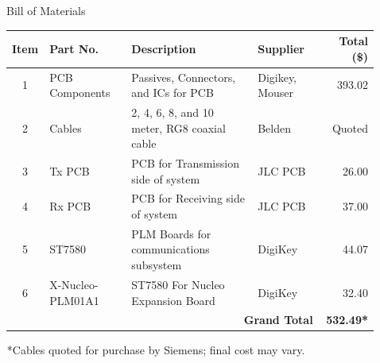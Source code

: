 \documentclass[final]{beamer}
\newlength{\sepwidth}
\newlength{\colwidth}
\newcommand{\separatorcolumn}{\begin{column}{\sepwidth}\end{column}}
\newcommand{\sectionHeading}[1]{\vskip2.0ex \textbf{#1} \vskip0.25ex}
\begin{document}
\begin{frame}[t]
\begin{columns}[t]
\begin{column}{\colwidth}
  \begin{block}{Bill of Materials}
    \centering
    \renewcommand{\arraystretch}{1.2}
    \begin{tabularx}{\linewidth}{
        c                          %
        l                          %
        X                          %
        l                          %
        r%
        }
        \toprule
        \textbf{Item} & \textbf{Part No.} & \textbf{Description} & \textbf{Supplier} & {\textbf{Total (\$)}} \\
        \midrule
        1 & PCB Components    & Passives, Connectors, and ICs for PCB               & Digikey, Mouser       & 393.02  \\
        2 & Cables            & 2, 4, 6, 8, and 10 meter, RG8 coaxial cable                              & Belden                & Quoted    \\
        3 & Tx PCB            & PCB for Transmission side of system                 & JLC PCB               & 26.00   \\
        4 & Rx PCB            & PCB for Receiving side of system                    & JLC PCB               & 37.00   \\
        5 & ST7580            & PLM Boards for communications subsystem             & DigiKey               & 44.07   \\
        6 & X-Nucleo-PLM01A1  & ST7580 For Nucleo Expansion Board                   & DigiKey               & 32.40   \\
        \midrule
        \multicolumn{4}{r}{\textbf{Grand Total}} & \bfseries 532.49* \\
        \bottomrule
    \end{tabularx}
    \vspace{0.3em}
    {\footnotesize\raggedright $^{}$*Cables quoted for purchase by Siemens; final cost may vary.\par}
  \end{block}

\end{column}

\separatorcolumn

\begin{column}{\colwidth}
\end{column}
\end{columns}
\end{frame}
\end{document}
